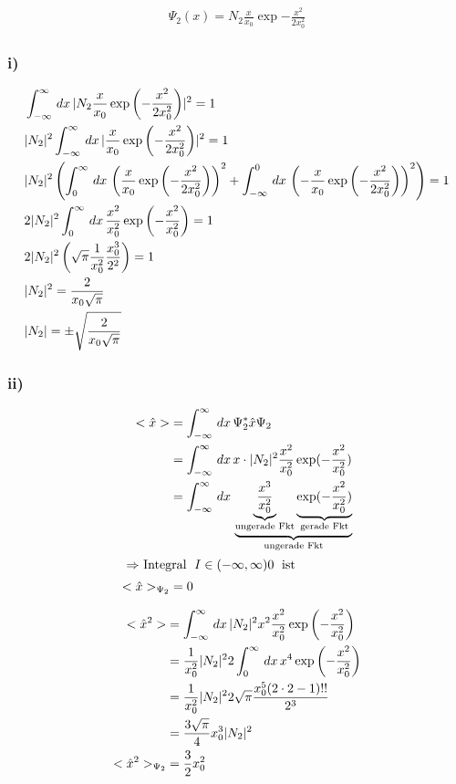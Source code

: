 \begin{align}
    \Psi_2 (x)=N_2 \frac{x}{x_0} \exp{-\frac{x^2}{2x_0^2}}
\end{align}

\subsubsection{i)}

\begin{align}
    &\int_{-\infty}^{\infty}\,dx\, \lvert N_2\frac{x}{x_0}\exp\left(-\frac{x^2}{2x_0^2}\right)\rvert^2=1\\
    &\lvert N_2\rvert^2 \int_{-\infty}^{\infty}\,dx\, \lvert\frac{x}{x_0}\exp\left(-\frac{x^2}{2x_0^2}\right)\rvert^2=1\\
    &\lvert N_2\rvert^2 \left(\int_0^{\infty}\,dx\,\left(\frac{x}{x_0}\exp\left(-\frac{x^2}{2x_0^2}\right)\right)^2+ \int_{-\infty}^0\,dx\,\left(-\frac{x}{x_0} \exp\left(-\frac{x^2}{2x_0^2}\right)\right)^2 \right)=1\\
    &2 \lvert N_2\rvert^2 \int_0^{\infty}\,dx\, \frac{x^2}{x_0^2} \exp\left(-\frac{x^2}{x_0^2}\right)=1\\
    &2 \lvert N_2\rvert^2 \left(\sqrt{\pi} \frac{1}{x_0^2} \frac{x_0^3}{2^2}\right)=1\\
    &\lvert N_2\rvert^2=\frac{2}{x_0\sqrt{\pi}}\\
    &\lvert N_2\rvert= \pm \sqrt{\frac{2}{x_0\sqrt{\pi}}}
\end{align}

\subsubsection{ii)}

\begin{align}
    <\hat x > &= \int_{-\infty}^{\infty}\,dx\, \Psi _2^* \hat x \Psi _2\\
    &= \int_{-\infty}^{\infty}\,dx\, x\cdot  \lvert N_2\rvert^2 \frac{x^2}{x_0^2}\exp(-\frac{x^2}{x_0^2})\\
    &=\int_{-\infty}^{\infty}\,dx\, \underbrace{\underbrace{\frac{x^3}{x_0^2}}_{\text{ungerade Fkt}} \underbrace{\exp(-\frac{x^2}{x_0^2})}_{\text{gerade Fkt}}}_{\text{ungerade Fkt}}\\
    \intertext{
        $\Rightarrow $ Integral $\;I \in (-\infty,\infty) 0\; $ ist
    }
    <\hat x >_{\Psi_2}&=0
\end{align}

\begin{align}
    <\hat x ^2> &= \int_{-\infty}^{\infty}\,dx\, \lvert N_2\rvert^2 x^2 \frac{x^2}{x_0^2} \exp\left(-\frac{x^2}{x_0^2}\right)\\
    &=\frac{1}{x_0^2} \lvert N_2\rvert^2 2 \int_0^{\infty}\,dx\, x^4 \exp\left(-\frac{x^2}{x_0^2}\right)\\
    &=\frac{1}{x_0^2} \lvert N_2\rvert^2 2\sqrt{\pi} \frac{x_0^5(2\cdot2-1)!!}{2^3}\\
    &=\frac{3\sqrt{\pi}}{4}x_0^3 \lvert N_2\rvert^2\\
    <\hat x ^2>_{\Psi _2}&= \frac{3}{2} x_0^2
\end{align}

